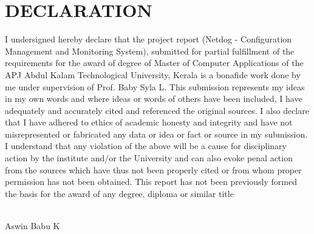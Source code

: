 \chapter*{\rm \large \bf DECLARATION}
\vspace{4.0mm}
\setlength{\parindent}{4em}
I undersigned hereby declare that the project report
(Netdog - Configuration Management and Monitoring System), submitted for partial
fulfillment of the requirements for the award of degree of Master of Computer
Applications of the APJ Abdul Kalam Technological University, Kerala is a
bonafide work done by me under supervision of Prof. Baby Syla L. This
submission represents my ideas in my own words and where ideas or words of
others have been included, I have adequately and accurately cited and
referenced the original sources. I also declare that I have adhered to ethics
of academic honesty and integrity and have not misrepresented or fabricated any
data or idea or fact or source in my submission. I understand that any
violation of the above will be a cause for disciplinary action by the institute
and/or the University and can also evoke penal action from the sources which
have thus not been properly cited or from whom proper permission has not been
obtained. This report has not been previously formed the basis for the award of
any degree, diploma or similar title
\\

\vspace{0.3 cm}

\\
\hfill {Aswin Babu K}\\

\newpage 
